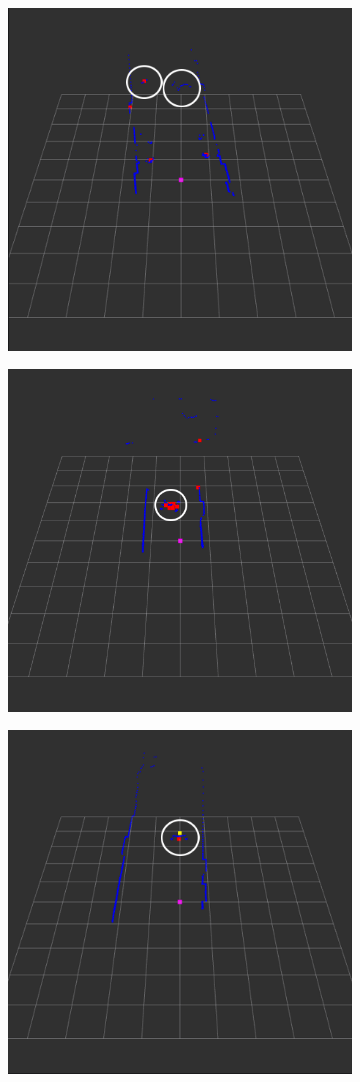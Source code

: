 \documentclass{article}
\begin{document}
\begin{figure}[t]
	\centering
	\begin{subfigure}{.5\textwidth}
		\centering
		\includegraphics[width=.65\linewidth, height=.65\linewidth]{ftd_al_false_negative}
		\caption{}
		\label{fig:ftd_al_false_negative}
	\end{subfigure}%
	\begin{subfigure}{.5\textwidth}
		\centering
		\includegraphics[width=.65\linewidth, height=.65\linewidth]{ftd_al_false_positive}
		\caption{}
		\label{fig:ftd_al_false_positive}
	\end{subfigure}
	\parbox[b]{\textwidth}{}
	\begin{subfigure}{.5\textwidth}
		\centering
		\includegraphics[width=.65\linewidth, height=.65\linewidth]{ftd_al_positive_wc}

\end{subfigure}
\end{figure}
\end{document}
